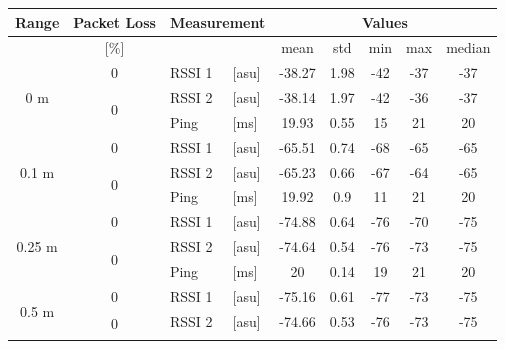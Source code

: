 \begin{table}[H]
    \centering
    \begin{tabular}{|c|c|l|l|c|c|c|c|c|}
    \hline
        Range & Packet Loss & \multicolumn{2}{l|}{Measurement} & \multicolumn{5}{c|}{Values} \\\hline
        [meters] & [\%] & \multicolumn{2}{l|}{} & mean & std & min & max & median \\\hline\hline
        \multirow{3}{*}{0 m} & \multirow{1}{*}{0} & RSSI 1 & [asu] & -38.27 & 1.98 & -42 & -37 & -37 \\\cline{2-9}\cline{2-9}
        & \multirow{2}{*}{0} & RSSI 2 & [asu] & -38.14 & 1.97 & -42 & -36 & -37 \\\cline{3-9}
        && Ping & [ms] & 19.93 & 0.55 & 15 & 21 & 20 \\\hline\hline
        \multirow{3}{*}{0.1 m} & \multirow{1}{*}{0} & RSSI 1 & [asu] & -65.51 & 0.74 & -68 & -65 & -65 \\\cline{2-9}\cline{2-9}
        & \multirow{2}{*}{0} & RSSI 2 & [asu] & -65.23 & 0.66 & -67 & -64 & -65 \\\cline{3-9}
        && Ping & [ms] & 19.92 & 0.9 & 11 & 21 & 20 \\\hline\hline
        \multirow{3}{*}{0.25 m} & \multirow{1}{*}{0} & RSSI 1 & [asu] & -74.88 & 0.64 & -76 & -70 & -75 \\\cline{2-9}\cline{2-9}
        & \multirow{2}{*}{0} & RSSI 2 & [asu] & -74.64 & 0.54 & -76 & -73 & -75 \\\cline{3-9}
        && Ping & [ms] & 20 & 0.14 & 19 & 21 & 20 \\\hline\hline
        \multirow{3}{*}{0.5 m} & \multirow{1}{*}{0} & RSSI 1 & [asu] & -75.16 & 0.61 & -77 & -73 & -75 \\\cline{2-9}\cline{2-9}
        & \multirow{2}{*}{0} & RSSI 2 & [asu] & -74.66 & 0.53 & -76 & -73 & -75 \\\cline{3-9}

\end{tabular}
\end{table}
